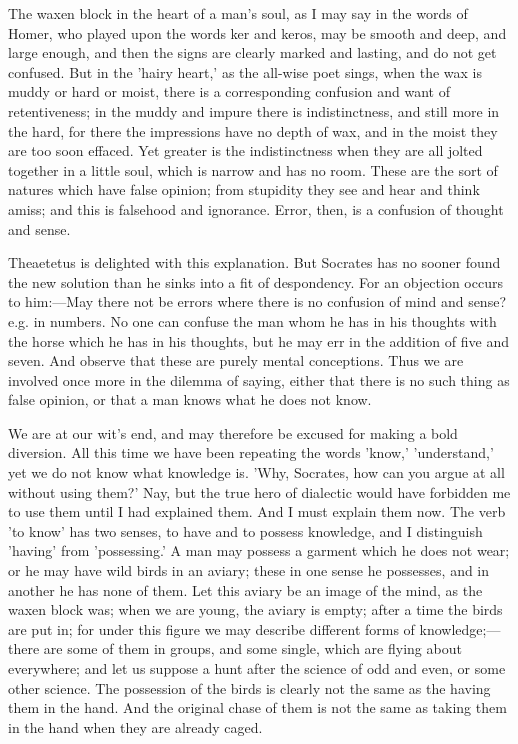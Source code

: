 \documentclass[11pt,letter]{article}
\begin{document}
\par  The waxen block in the heart of a man's soul, as I may say in the words of Homer, who played upon the words ker and keros, may be smooth and deep, and large enough, and then the signs are clearly marked and lasting, and do not get confused. But in the 'hairy heart,' as the all-wise poet sings, when the wax is muddy or hard or moist, there is a corresponding confusion and want of retentiveness; in the muddy and impure there is indistinctness, and still more in the hard, for there the impressions have no depth of wax, and in the moist they are too soon effaced. Yet greater is the indistinctness when they are all jolted together in a little soul, which is narrow and has no room. These are the sort of natures which have false opinion; from stupidity they see and hear and think amiss; and this is falsehood and ignorance. Error, then, is a confusion of thought and sense.

\par  Theaetetus is delighted with this explanation. But Socrates has no sooner found the new solution than he sinks into a fit of despondency. For an objection occurs to him:—May there not be errors where there is no confusion of mind and sense? e.g. in numbers. No one can confuse the man whom he has in his thoughts with the horse which he has in his thoughts, but he may err in the addition of five and seven. And observe that these are purely mental conceptions. Thus we are involved once more in the dilemma of saying, either that there is no such thing as false opinion, or that a man knows what he does not know.

\par  We are at our wit's end, and may therefore be excused for making a bold diversion. All this time we have been repeating the words 'know,' 'understand,' yet we do not know what knowledge is. 'Why, Socrates, how can you argue at all without using them?' Nay, but the true hero of dialectic would have forbidden me to use them until I had explained them. And I must explain them now. The verb 'to know' has two senses, to have and to possess knowledge, and I distinguish 'having' from 'possessing.' A man may possess a garment which he does not wear; or he may have wild birds in an aviary; these in one sense he possesses, and in another he has none of them. Let this aviary be an image of the mind, as the waxen block was; when we are young, the aviary is empty; after a time the birds are put in; for under this figure we may describe different forms of knowledge;—there are some of them in groups, and some single, which are flying about everywhere; and let us suppose a hunt after the science of odd and even, or some other science. The possession of the birds is clearly not the same as the having them in the hand. And the original chase of them is not the same as taking them in the hand when they are already caged.
\end{document}
